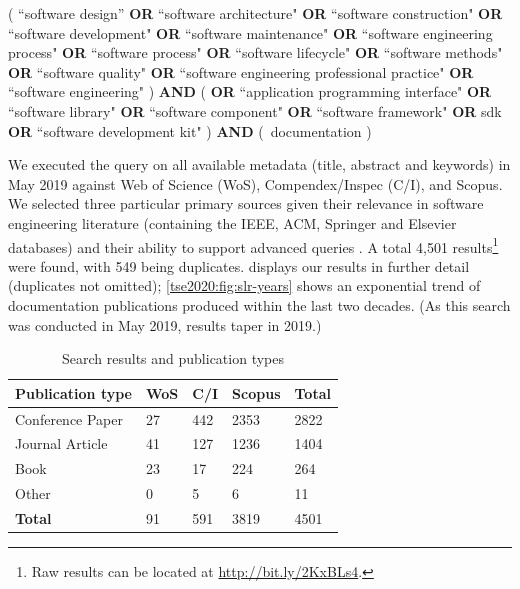 \begin{framed}
\noindent
\parbox{\linewidth}{
\scriptsize
( ``software design'' \textbf{OR} ``software architecture" \textbf{OR} ``software construction" \textbf{OR} ``software development" \textbf{OR} ``software maintenance" \textbf{OR} ``software engineering process" \textbf{OR} ``software process" \textbf{OR} ``software lifecycle" \textbf{OR} ``software methods" \textbf{OR} ``software quality" \textbf{OR} ``software engineering professional practice" \textbf{OR} ``software engineering" ) \textbf{AND} (  \textbf{OR} ``application programming interface" \textbf{OR} ``software library" \textbf{OR} ``software component" \textbf{OR} ``software framework" \textbf{OR} sdk \textbf{OR} ``software development kit" ) \textbf{AND} (~documentation )
}
\end{framed}

We executed the query on all available metadata (title, abstract and keywords) in May 2019 against Web of Science  (WoS), Compendex/Inspec (C/I), and Scopus. We selected three particular primary sources given their relevance in software engineering literature (containing the IEEE, ACM, Springer and Elsevier databases) and their ability to support advanced queries \citep{Brereton:2007by,Kitchenham:2007dd}. A total 4,501 results\footnote{Raw results can be located at \url{http://bit.ly/2KxBLs4}.} were found, with 549 being duplicates.  displays our results in further detail (duplicates not omitted); \cref{tse2020:fig:slr-years} shows an exponential trend of  documentation publications produced within the last two decades. (As this search was conducted in May 2019, results taper in 2019.)

\begin{table}[tb]
  \caption[Summary of search results in API documentation]{Search results and publication types}
  \label{tse2020:tab:search-results}
  \centering
  \begin{tabular}{l|lll|l}
    \toprule
    \textbf{Publication type} &
    \textbf{WoS} &
    \textbf{C/I} &
    \textbf{Scopus} &
    \textbf{Total} \\
    \midrule
    Conference Paper & 27 & 442 & 2353 & 2822 \\
    Journal Article & 41 & 127 & 1236 & 1404\\
    Book & 23 & 17 & 224 & 264\\
    Other & 0 & 5 & 6 & 11\\
    \midrule
    \textbf{Total} & 91 & 591 & 3819 & 4501\\
    \bottomrule
  \end{tabular}
\end{table}

